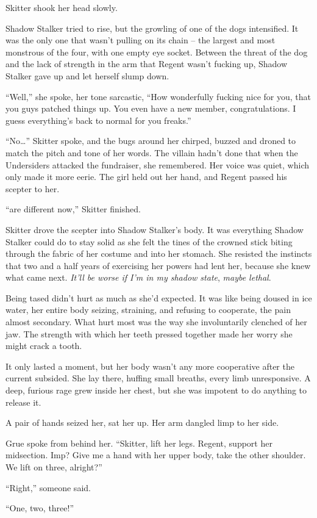 Skitter shook her head slowly.



Shadow Stalker tried to rise, but the growling of one of the dogs intensified.  It was the only one that wasn't pulling on its chain – the largest and most monstrous of the four, with one empty eye socket.  Between the threat of the dog and the lack of strength in the arm that Regent wasn't fucking up, Shadow Stalker gave up and let herself slump down.



``Well,'' she spoke, her tone sarcastic, ``How wonderfully fucking nice for you, that you guys patched things up.  You even have a new member, congratulations.  I guess everything's back to normal for you freaks.''



``No\ldots''  Skitter spoke, and the bugs around her chirped, buzzed and droned to match the pitch and tone of her words.  The villain hadn't done that when the Undersiders attacked the fundraiser, she remembered.   Her voice was quiet, which only made it more eerie.  The girl held out her hand, and Regent passed his scepter to her.



``\ldotsThings are different now,'' Skitter finished.



Skitter drove the scepter into Shadow Stalker's body.  It was everything Shadow Stalker could do to stay solid as she felt the tines of the crowned stick biting through the fabric of her costume and into her stomach.  She resisted the instincts that two and a half years of exercising her powers had lent her, because she knew what came next.  \emph{It'll be worse if I'm in my shadow state}, \emph{maybe lethal}.



Being tased didn't hurt as much as she'd expected.  It was like being doused in ice water, her entire body seizing, straining, and refusing to cooperate, the pain almost secondary.  What hurt most was the way she involuntarily clenched of her jaw.  The strength with which her teeth pressed together made her worry she might crack a tooth.



It only lasted a moment, but her body wasn't any more cooperative after the current subsided.  She lay there, huffing small breaths, every limb unresponsive.  A deep, furious rage grew inside her chest, but she was impotent to do anything to release it.



A pair of hands seized her, sat her up.  Her arm dangled limp to her side.



Grue spoke from behind her.  ``Skitter, lift her legs.  Regent, support her midsection.  Imp?  Give me a hand with her upper body, take the other shoulder.  We lift on three, alright?''



``Right,'' someone said.



``One, two, three!''





